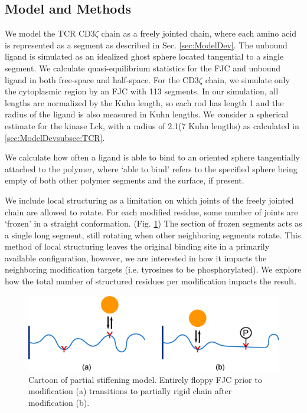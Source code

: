 \documentclass[../../AdvancementSummary.tex]{subfiles}
\begin{document}
\subsection{Model and Methods}

We model the TCR CD3$\zeta$ chain as a freely jointed chain, where each amino acid is represented as a segment as described in Sec. \ref{sec:ModelDev}. The unbound ligand is simulated as an idealized ghost sphere located tangential to a single segment. We calculate quasi-equilibrium statistics for the FJC and unbound ligand in both free-space and half-space. For the CD3$\zeta$ chain, we simulate only the cytoplasmic region by an FJC with 113 segments. In our simulation, all lengths are normalized by the Kuhn length, so each rod has length 1 and the radius of the ligand is also measured in Kuhn lengths. We consider a spherical estimate for the kinase Lck, with a radius of 2.1\nm (7 Kuhn lengths) as calculated in \ref{sec:ModelDevsubsec:TCR}.

We calculate how often a ligand is able to bind to an oriented sphere tangentially attached to the polymer, where `able to bind' refers to the specified sphere being empty of both other polymer segments and the surface, if present. 

We include local structuring as a limitation on which joints of the freely jointed chain are allowed to rotate. For each modified residue, some number of joints are `frozen' in a straight conformation. (Fig. \ref{fig: StiffeningCartoon}) The section of frozen segments acts as a single long segment, still rotating when other neighboring segments rotate. This method of local structuring leaves the original binding site in a primarily available configuration, however, we are interested in how it impacts the neighboring modification targets (i.e. tyrosines to be phosphorylated). We explore how the total number of structured residues per modification impacts the result. 

\begin{figure}[H]
\begin{center}
    \includegraphics[width=0.8\linewidth]{ResultsFigures/StiffeningDiagram/StiffeningDiagram.eps}
    \caption{Cartoon of partial stiffening model. Entirely floppy FJC prior to modification (a) transitions to partially rigid chain after modification (b). \label{fig: StiffeningCartoon}}
    \end{center}
\end{figure}
\end{document}

